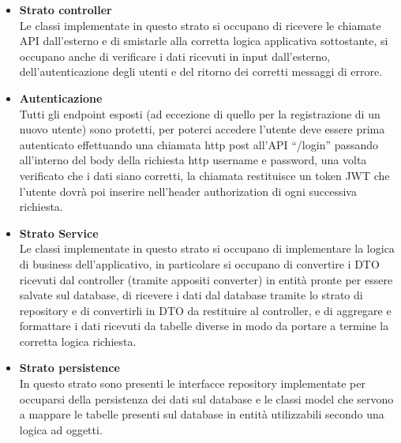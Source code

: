 \documentclass{article}
\begin{document}
\begin{itemize}
\item \textbf{Strato controller}\\
Le classi implementate in questo strato si occupano di ricevere le chiamate API dall’esterno e di smistarle alla corretta logica applicativa sottostante, si occupano anche di verificare i dati ricevuti in input dall’esterno, dell’autenticazione degli utenti e del ritorno dei corretti messaggi di errore.
\item \textbf{Autenticazione}\\
Tutti gli endpoint esposti (ad eccezione di quello per la registrazione di un nuovo utente) sono protetti, per poterci accedere l’utente deve essere prima autenticato effettuando una chiamata http post all’API “/login” passando all’interno del body della richiesta http username e password, una volta verificato che i dati siano corretti, la chiamata restituisce un token JWT che l’utente dovrà poi inserire nell’header authorization di ogni successiva richiesta.
\item \textbf{Strato Service}\\
Le classi implementate in questo strato si occupano di implementare la logica di business dell’applicativo, in particolare si occupano di convertire i DTO ricevuti dal controller (tramite appositi converter) in entità pronte per essere salvate sul database, di ricevere i dati dal database tramite lo strato di repository e di convertirli in DTO da restituire al controller, e di aggregare e formattare i dati ricevuti da tabelle diverse in modo da portare a termine la corretta logica richiesta.
\item \textbf{Strato persistence}\\
In questo strato sono presenti le interfacce repository implementate per occuparsi della persistenza dei dati sul database e le classi model che servono a mappare le tabelle presenti sul database in entità utilizzabili secondo una logica ad oggetti.
\end{itemize}
\clearpage
\end{document}
